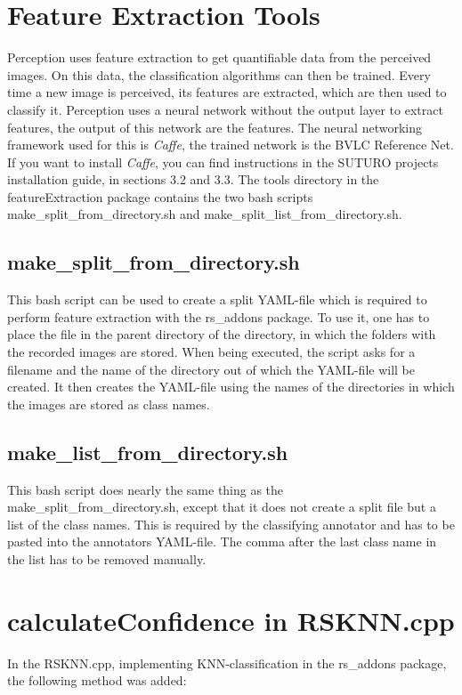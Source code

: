 \documentclass[main.tex]{subfiles}
\begin{document}
\section{Feature Extraction Tools}
Perception uses feature extraction to get quantifiable data from the perceived images. On this data, the classification algorithms can then be trained. Every time a new image is perceived, its features are extracted, which are then used to classify it. Perception uses a neural network without the output layer to extract features, the output of this network are the features. The neural networking framework used for this is \textit{Caffe}, the trained network is the BVLC Reference Net. If you want to install \textit{Caffe}, you can find instructions in the SUTURO projects installation guide, in sections 3.2 and 3.3. The tools directory in the featureExtraction package contains the two bash scripts make\_split\_from\_directory.sh and make\_split\_list\_from\_directory.sh.

\subsection{make\_split\_from\_directory.sh} 
This bash script can be used to create a split YAML-file which is required to perform feature extraction with the rs\_addons package. To use it, one has to place the file in the parent directory of the directory, in which the folders with the recorded images are stored. When being executed, the script asks for a filename and the name of the directory out of which the YAML-file will be created. It then creates the YAML-file using the names of the directories in which the images are stored as class names.

\subsection{make\_list\_from\_directory.sh}
This bash script does nearly the same thing as the make\_split\_from\_directory.sh, except that it does not create a split file but a list of the class names. This is required by the classifying annotator and has to be pasted into the annotators YAML-file. The comma after the last class name in the list has to be removed manually.

\section{calculateConfidence in RSKNN.cpp}\label{KNN confidence}
In the RSKNN.cpp, implementing KNN-classification in the rs\_addons package, the following method was added:
\end{document}
